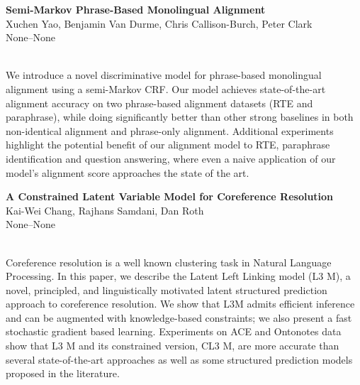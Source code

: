 \documentclass[twoside,makeidx]{book}
\begin{document}
\par\vspace{2em}\noindent%
\begin{minipage}{\linewidth}%
\begin{center}
\textbf{\normalsize Semi-Markov Phrase-Based Monolingual Alignment}\\
\normalsize  Xuchen Yao,  Benjamin Van Durme,  Chris Callison-Burch,  Peter Clark\\
{\small None--None}\\
\end{center}
\end{minipage}\\[0.5em]
\nopagebreak%
\noindent%
{\small We introduce a novel discriminative model for phrase-based monolingual alignment using a semi-Markov CRF. Our model achieves state-of-the-art alignment accuracy on two phrase-based alignment datasets (RTE and paraphrase), while doing significantly better than other strong baselines in both non-identical alignment and phrase-only alignment. Additional experiments highlight the potential benefit of our alignment model to RTE, paraphrase identification and question answering, where even a naive application of our model's alignment score approaches the state of the art.}
\par\vspace{2em}\noindent%
\begin{minipage}{\linewidth}%
\begin{center}
\textbf{\normalsize A Constrained Latent Variable Model for Coreference Resolution}\\
\normalsize  Kai-Wei Chang,  Rajhans Samdani,  Dan Roth\\
{\small None--None}\\
\end{center}
\end{minipage}\\[0.5em]
\nopagebreak%
\noindent%
{\small Coreference resolution is a well known clustering task in Natural Language Processing. In this paper, we describe the Latent Left Linking model (L3 M), a novel, principled, and linguistically motivated latent structured prediction approach to coreference resolution. We show that L3M admits efficient inference and can be augmented with knowledge-based constraints; we also present a fast stochastic gradient based learning. Experiments on ACE and Ontonotes data show that L3 M and its constrained version, CL3 M, are more accurate than several state-of-the-art approaches as well as some structured prediction models proposed in the literature.}
\end{document}
